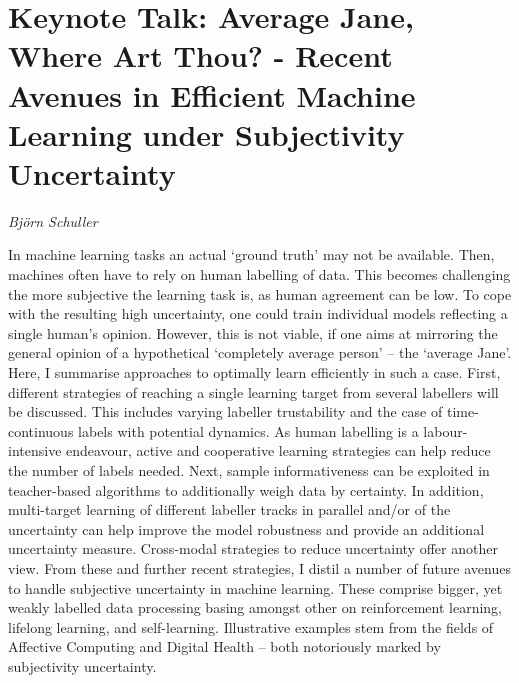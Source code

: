 \documentclass[../booklet.tex]{subfiles}
\begin{document}
\section[Keynote Talk: Average Jane, Where Art Thou? - Recent Avenues in Efficient Machine Learning under Subjectivity Uncertainty. {\it Björn Schuller}]{Keynote Talk: Average Jane, Where Art Thou? - Recent Avenues in Efficient Machine Learning under Subjectivity Uncertainty}

\begin{center}
  {\it Björn Schuller}
\end{center}

\vskip 0.8cm


In machine learning tasks an actual `ground truth' may not be available. Then, machines often have to rely on human labelling of data. This becomes challenging the more subjective the learning task is, as human agreement can be low. To cope with the resulting high uncertainty, one could train individual models reflecting a single human's opinion. However, this is not viable, if one aims at mirroring the general opinion of a hypothetical `completely average person' -- the `average Jane'. Here, I summarise approaches to optimally learn efficiently in such a case. First, different strategies of reaching a single learning target from several labellers will be discussed. This includes varying labeller trustability and the case of time-continuous labels with potential dynamics. As human labelling is a labour-intensive endeavour, active and cooperative learning strategies can help reduce the number of labels needed. Next, sample informativeness can be exploited in teacher-based algorithms to additionally weigh data by certainty. In addition, multi-target learning of different labeller tracks in parallel and/or of the uncertainty can help improve the model robustness and provide an additional uncertainty measure. Cross-modal strategies to reduce uncertainty offer another view. From these and further recent strategies, I distil a number of future avenues to handle subjective uncertainty in machine learning. These comprise bigger, yet weakly labelled data processing basing amongst other on reinforcement learning, lifelong learning, and self-learning. Illustrative examples stem from the fields of Affective Computing and Digital Health -- both notoriously marked by subjectivity uncertainty.

% 
\end{document}
